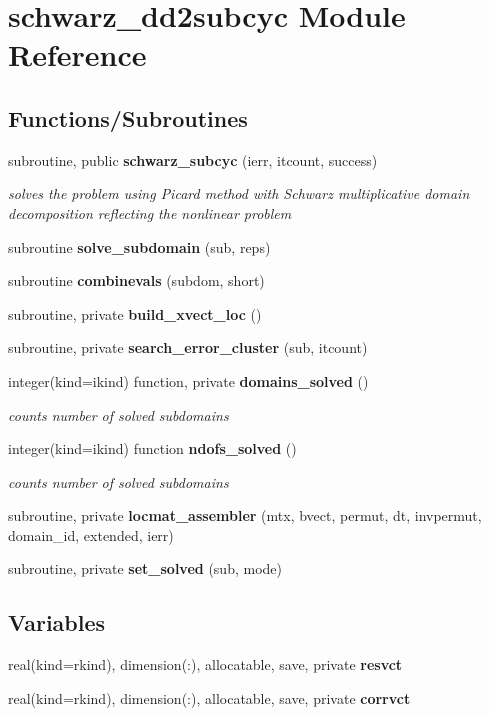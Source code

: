 \section{schwarz\+\_\+dd2subcyc Module Reference}
\label{namespaceschwarz__dd2subcyc}
\subsection*{Functions/\+Subroutines}
\begin{DoxyCompactItemize}
\item 
subroutine, public {\bf schwarz\+\_\+subcyc} (ierr, itcount, success)
\begin{DoxyCompactList}\small\item\em solves the problem using Picard method with Schwarz multiplicative domain decomposition reflecting the nonlinear problem \end{DoxyCompactList}\item 
subroutine {\bf solve\+\_\+subdomain} (sub, reps)
\item 
subroutine {\bf combinevals} (subdom, short)
\item 
subroutine, private {\bf build\+\_\+xvect\+\_\+loc} ()
\item 
subroutine, private {\bf search\+\_\+error\+\_\+cluster} (sub, itcount)
\item 
integer(kind=ikind) function, private {\bf domains\+\_\+solved} ()
\begin{DoxyCompactList}\small\item\em counts number of solved subdomains \end{DoxyCompactList}\item 
integer(kind=ikind) function {\bf ndofs\+\_\+solved} ()
\begin{DoxyCompactList}\small\item\em counts number of solved subdomains \end{DoxyCompactList}\item 
subroutine, private {\bf locmat\+\_\+assembler} (mtx, bvect, permut, dt, invpermut, domain\+\_\+id, extended, ierr)
\item 
subroutine, private {\bf set\+\_\+solved} (sub, mode)
\end{DoxyCompactItemize}
\subsection*{Variables}
\begin{DoxyCompactItemize}
\item 
real(kind=rkind), dimension(\+:), allocatable, save, private {\bf resvct}
\item 
real(kind=rkind), dimension(\+:), allocatable, save, private {\bf corrvct}
\end{DoxyCompactItemize}


